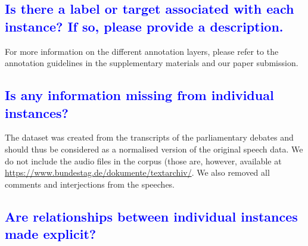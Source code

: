 \documentclass[letterpaper, 10 pt, conference]{ieeeconf}  %
\begin{document}
% 
 


\textcolor{blue}{\subsection{Is there a label or target associated with each instance? If so, please
provide a description.}}


For more information on the different annotation layers, please refer to the annotation guidelines in the supplementary materials and our paper submission.


\textcolor{blue}{\subsection{Is any information missing from individual instances?}}

The dataset was created from the transcripts of the parliamentary debates and should thus be considered as a normalised version of the original speech data. We do not include the audio files in the corpus (those are, however, available at \url{https://www.bundestag.de/dokumente/textarchiv/}. 
We also removed all comments and interjections from the speeches. 



\textcolor{blue}{\subsection{Are relationships between individual instances made explicit?}} %
\end{document}
